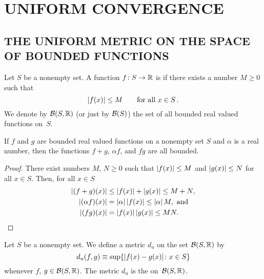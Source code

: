 \chapter{UNIFORM CONVERGENCE}\label{unif_conv}



\section{THE UNIFORM METRIC ON THE SPACE OF BOUNDED FUNCTIONS}
\begin{defn} Let $S$ be a nonempty set. A function $f \colon S \rightarrow \mathbb{R}$ is
 if there exists a number $M \ge 0$ such that
  \[ \lvert f(x)\rvert \le M \qquad \text{for all $x \in S$}\,. \]
We denote by
$\mathcal{B}(S,\mathbb{R})$ (or just by $\mathcal{B}(S)$) the set of all bounded real valued functions on~$S$.
\end{defn}

\begin{prop}\label{uc_prop1} If $f$ and $g$ are bounded real valued functions on a nonempty set
$S$ and $\alpha$ is a real number, then the functions $f + g$, $\alpha f$, and $fg$ are all
bounded.
\end{prop}

\begin{proof} There exist numbers $M$, $N \ge 0$ such that $\lvert f(x)\rvert \le M$ and $\lvert g(x)\rvert
\le N$ for all $x \in S$. Then, for all $x \in S$
 \begin{align*}
         \lvert(f + g)(x)\rvert &\le \lvert f(x)\rvert + \lvert g(x)\rvert \le M + N, \\
     \lvert(\alpha f)(x)\rvert  &= \lvert\alpha\rvert\,\lvert f(x)\rvert \le \lvert\alpha\rvert\,M, \text{ and}\\
            \lvert(fg)(x)\rvert &= \lvert f(x)\rvert\,\lvert g(x)\rvert \le MN.  \qedhere
 \end{align*}
\end{proof}

\begin{defn}\label{unif_met} Let $S$ be a nonempty set. We define a metric $d_u$ on the set
$\mathcal{B}(S,\mathbb{R})$ by
  \[ d_u(f,g) \equiv \sup\{\lvert f(x) - g(x)\rvert \colon x \in S\} \]
whenever $f$, $g \in \mathcal{B}(S,\mathbb{R})$. The metric $d_u$ is the
 on~$\mathcal{B}(S,\mathbb{R})$.
\end{defn}

